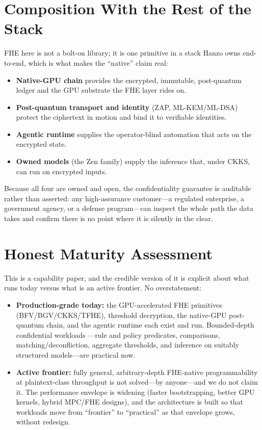 \documentclass[11pt,letterpaper]{article}
\begin{document}
\section{Composition With the Rest of the Stack}

FHE here is not a bolt-on library; it is one primitive in a stack Hanzo owns
end-to-end, which is what makes the ``native'' claim real:

\begin{itemize}
  \item \textbf{Native-GPU chain} provides the encrypted, immutable, post-quantum
  ledger and the GPU substrate the FHE layer rides on.
  \item \textbf{Post-quantum transport and identity} (ZAP, ML-KEM/ML-DSA) protect
  the ciphertext in motion and bind it to verifiable identities.
  \item \textbf{Agentic runtime} supplies the operator-blind automation that acts on
  the encrypted state.
  \item \textbf{Owned models} (the Zen family) supply the inference that, under
  CKKS, can run on encrypted inputs.
\end{itemize}

Because all four are owned and open, the confidentiality guarantee is auditable
rather than asserted: any high-assurance customer---a regulated enterprise, a
government agency, or a defense program---can inspect the whole path the data takes
and confirm there is no point where it is silently in the clear.

\section{Honest Maturity Assessment}

This is a capability paper, and the credible version of it is explicit about what
runs today versus what is an active frontier. No overstatement:

\begin{itemize}
  \item \textbf{Production-grade today:} the GPU-accelerated FHE primitives
  (BFV/BGV/CKKS/TFHE), threshold decryption, the native-GPU post-quantum chain, and
  the agentic runtime each exist and run. Bounded-depth confidential workloads
  ---rule and policy predicates, comparisons, matching/deconfliction, aggregate
  thresholds, and inference on suitably structured models---are practical now.
  \item \textbf{Active frontier:} fully general, arbitrary-depth FHE-native
  programmability at plaintext-class throughput is not solved---by anyone---and we do
  not claim it. The performance envelope is widening (faster bootstrapping, better
  GPU kernels, hybrid MPC/FHE designs), and the architecture is built so that
  workloads move from ``frontier'' to ``practical'' as that envelope grows, without
  redesign.
\end{itemize}
\end{document}
